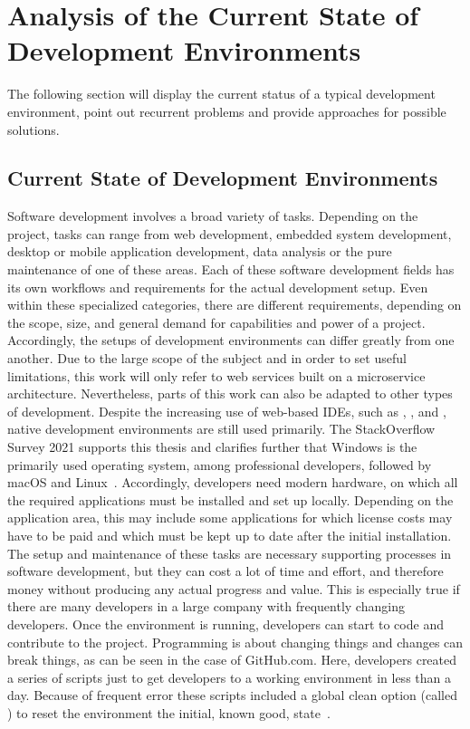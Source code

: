 

\section{Analysis of the Current State of Development Environments}\label{sec::problem}
The following section will display the current status of a typical development environment, point out recurrent problems and provide approaches for possible solutions.

    \subsection{Current State of Development Environments}
    Software development involves a broad variety of tasks. Depending on the project, tasks can range from web development, embedded system development, desktop or mobile application development, data analysis or the pure maintenance of one of these areas. Each of these software development fields has its own workflows and requirements for the actual development setup. Even within these specialized categories, there are different requirements, depending on the scope, size, and general demand for capabilities and power of a project. Accordingly, the setups of development environments can differ greatly from one another. Due to the large scope of the subject and in order to set useful limitations, this work will only refer to web services built on a microservice architecture. Nevertheless, parts of this work can also be adapted to other types of development.\newline
    Despite the increasing use of web-based \ac{IDE}s, such as , ,  and , native development environments are still used primarily. The StackOverflow Survey 2021 supports this thesis and clarifies further that Windows is the primarily used operating system, among professional developers, followed by macOS and Linux~\cite{stackoverflow2021}. Accordingly, developers need modern hardware, on which all the required applications must be installed and set up locally. Depending on the application area, this may include some applications for which license costs may have to be paid and which must be kept up to date after the initial installation. The setup and maintenance of these tasks are necessary supporting processes in software development, but they can cost a lot of time and effort, and therefore money without producing any actual progress and value. This is especially true if there are many developers in a large company with frequently changing developers. Once the environment is running, developers can start to code and contribute to the project. Programming is about changing things and changes can break things, as can be seen in the case of GitHub.com. Here, developers created a series of scripts just to get developers to a working environment in less than a day. Because of frequent error these scripts included a global clean option (called ) to reset the environment the initial, known good, state~\cite{githubblogcodespace}.\newline
